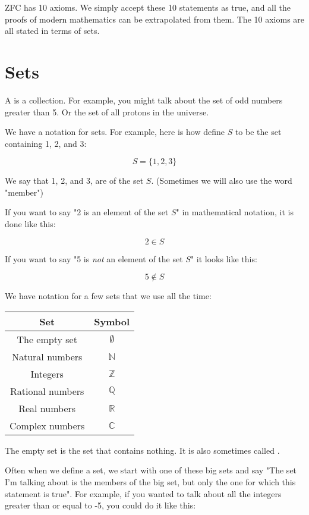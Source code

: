 ZFC has 10 axioms.  We simply accept these 10 statements as true, and
all the proofs of modern mathematics can be extrapolated from them.
The 10 axioms are all stated in terms of sets.

\section{Sets}

A  is a collection.  For example, you might talk about the set of
odd numbers greater than 5.  Or the set of all protons in the
universe.  

We have a notation for sets.  For example, here is how define $S$ to
be the set containing 1, 2, and 3:

$$S = \{1, 2, 3\}$$

We say that 1, 2, and 3, are  of the set $S$.
(Sometimes we will also use the word "member")

If you want to say "2 is an element of the set $S$" in mathematical
notation, it is done like this:

$$ 2 \in S$$

If you want to say "5 is \textit{not} an element of the set $S$" it
looks like this:

$$ 5 \notin S$$

We have notation for a few sets that we use all the time:

\begin{tabular}{c|c}
Set & Symbol \\
\hline
The empty set & $\emptyset$ \\ \index{$\emptyset$}
Natural numbers & $\mathbb{N}$ \\ \index{$\mathbb{N}$}
Integers & $\mathbb{Z}$ \\ \index{$\mathbb{Z}$}
Rational numbers & $\mathbb{Q}$ \\ \index{$\mathbb{Q}$}
Real numbers & $\mathbb{R}$ \\ \index{$\mathbb{R}$}
Complex numbers & $\mathbb{C}$ \index{$\mathbb{C}$}
\end{tabular}

The empty set is the set that contains nothing.  It is also sometimes
called .

Often when we define a set, we start with one of these big sets and
say "The set I'm talking about is the members of the big set, but only
the one for which this statement is true".  For example, if you wanted
to talk about all the integers greater than or equal to -5, you could
do it like this:

